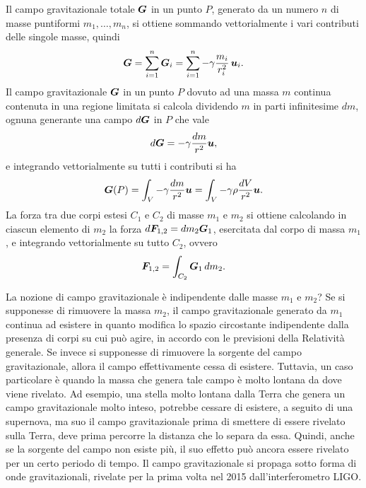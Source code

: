 Il campo gravitazionale totale $\bm{G}$ in un punto $P$, generato da un numero $n$ di masse puntiformi $m_1,\dots,m_n$, si ottiene sommando vettorialmente i vari contributi delle singole masse, quindi
\begin{equation}
    \bm{G}=\sum_{i=1}^n\bm{G}_i=\sum_{i=1}^n-\gamma\frac{m_i}{r_i^2}\,\bm{u}_i.
\end{equation}
Il campo gravitazionale $\bm{G}$ in un punto $P$ dovuto ad una massa $m$ continua contenuta in una regione limitata si calcola dividendo $m$ in parti infinitesime $dm$, ognuna generante una campo $d\bm{G}$ in $P$ che vale
\begin{equation}
    d\bm{G}=-\gamma\frac{dm}{r^2}\bm{u},
\end{equation}
e integrando vettorialmente su tutti i contributi si ha
\begin{equation}
    \bm{G}(P)=\int_V-\gamma\frac{dm}{r^2}\bm{u}=\int_V-\gamma\rho\frac{dV}{r^2}\bm{u}.
\end{equation}
La forza tra due corpi estesi $C_1$ e $C_2$ di masse $m_1$ e $m_2$ si ottiene calcolando in ciascun elemento di $m_2$ la forza $d\bm{F}_{1,2}=dm_2\bm{G}_1$, esercitata dal corpo di massa $m_1$, e integrando vettorialmente su tutto $C_2$, ovvero
\begin{equation}
    \bm{F}_{1,2}=\int_{C_2}\bm{G}_1\,dm_2.
\end{equation}
\begin{obs}
    La nozione di campo gravitazionale è indipendente dalle masse $m_1$ e $m_2$? Se si supponesse di rimuovere la massa $m_2$, il campo gravitazionale generato da $m_1$ continua ad esistere in quanto modifica lo spazio circostante indipendente dalla presenza di corpi su cui può agire, in accordo con le previsioni della Relatività generale. Se invece si supponesse di rimuovere la sorgente del campo gravitazionale, allora il campo effettivamente cessa di esistere. Tuttavia, un caso particolare è quando la massa che genera tale campo è molto lontana da dove viene rivelato. Ad esempio, una stella molto lontana dalla Terra che genera un campo gravitazionale molto inteso, potrebbe cessare di esistere, a seguito di una supernova, ma suo il campo gravitazionale prima di smettere di essere rivelato sulla Terra, deve prima percorre la distanza che lo separa da essa. Quindi, anche se la sorgente del campo non esiste più, il suo effetto può ancora essere rivelato per un certo periodo di tempo. Il campo gravitazionale si propaga sotto forma di onde gravitazionali, rivelate per la prima volta nel 2015 dall'interferometro LIGO. 
\end{obs}

